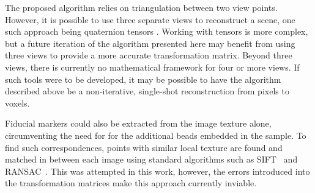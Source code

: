 \documentclass{osa-article}
\begin{document}
The proposed algorithm relies on triangulation between two view points.
However, it is possible to use three separate views %
to reconstruct a scene, one such approach being quaternion tensors \cite{?}.
Working with tensors is more complex, but a future iteration of the algorithm presented here may benefit from using three views to provide a more accurate transformation matrix.
Beyond three views, there is currently no mathematical framework for four or more views.
If such tools were to be developed, it may be possible to have the algorithm described above be a non-iterative, single-shot reconstruction from pixels to voxels.

Fiducial markers could also be extracted from the image texture alone, circumventing the need for for the additional beads embedded in the sample.
To find such correspondences, points with similar local texture are found and matched in between each image using standard algorithms such as SIFT~\cite{?} and RANSAC~\cite{?}. %
This was attempted in this work, however, the errors introduced into the transformation matrices make this approach currently inviable.
\pagebreak
%
%
%
%
%
\end{document}
